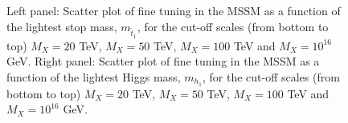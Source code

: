 \documentclass[preprint,amsmath,amssymb,aps,superscriptaddress,prd,showpacs,floatfix,nofootinbib]{revtex4-1}
\begin{document}
\begin{figure}[h]
\begin{center}
\caption{Left panel: Scatter plot of fine tuning in the MSSM as a function of
the lightest stop mass, $m_{\tilde{t}_1}$, for the cut-off scales (from 
bottom to top) $M_X=20$ TeV, $M_X=50$ TeV, $M_X=100$ TeV and $M_X=10^{16}$ GeV. 
Right panel: Scatter plot of fine tuning in the MSSM as a function of
the lightest Higgs mass, $m_{h_1}$, for the cut-off scales (from 
bottom to top) $M_X=20$ TeV, $M_X=50$ TeV, $M_X=100$ TeV and $M_X=10^{16}$ GeV.}
\label{Fig:mssmstoptuning}
\end{center}
\end{figure}
\end{document}
